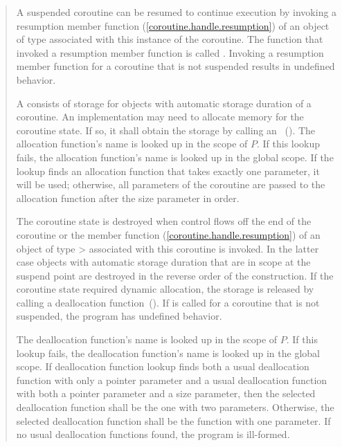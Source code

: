 \begin{quote}
\pnum
A suspended coroutine can be resumed
to continue execution by invoking
a resumption member function (\ref{coroutine.handle.resumption}) of an object of type  
associated with this instance of the coroutine. The function that invoked a resumption member function is called . Invoking a resumption member function for a coroutine that is not suspended results in undefined behavior. 

\pnum
A  consists of 
storage for objects with automatic storage duration of a coroutine.
An implementation may need to allocate
memory for the coroutine state. If so, it shall obtain the storage by calling an
~().
The allocation function's name is looked up in the scope of $P$. If this lookup fails, the allocation function's name is looked up in the global scope. If the lookup finds an allocation function that takes exactly one parameter, it will be used; otherwise, all parameters of the coroutine are passed to the allocation function after the size parameter in order.

\pnum
The coroutine state is destroyed when
control flows off the end of the coroutine or
the  member function (\ref{coroutine.handle.resumption}) of an object of type > associated with this coroutine is invoked. In the latter case objects with automatic storage duration that are in scope
at the suspend point are destroyed in the reverse order of the construction. If the coroutine state required dynamic allocation, the storage is released by calling a deallocation
function~(). If  is called for a coroutine that is not suspended, the program has undefined behavior.

\pnum
The deallocation function's name is looked up in the scope of $P$. If this lookup fails, the deallocation function's name is looked up in the global scope. If deallocation function lookup finds both a usual deallocation function with only a pointer parameter and a usual deallocation function with both a pointer parameter and a size parameter, then the selected deallocation function shall be the one with two parameters. Otherwise, the selected deallocation function shall be the function with one parameter. If no usual deallocation functions found, the program is ill-formed.



\end{quote}
